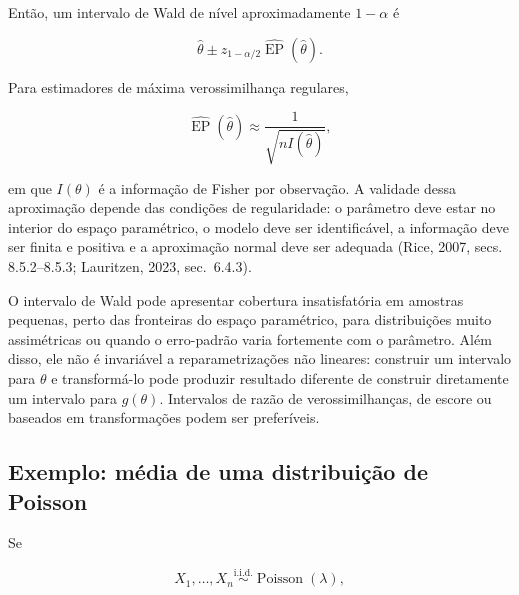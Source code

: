 \documentclass[
  letterpaper,
  DIV=11,
  numbers=noendperiod]{scrreprt}
\begin{document}
Então, um intervalo de Wald de nível aproximadamente \(1-\alpha\) é

\[\boxed{
\widehat\theta\pm z_{1-\alpha/2}
\widehat{\operatorname{EP}}(\widehat\theta)
}.\]

Para estimadores de máxima verossimilhança regulares,

\[\widehat{\operatorname{EP}}(\widehat\theta)
\approx\frac{1}{\sqrt{nI(\widehat\theta)}},\]

em que \(I(\theta)\) é a informação de Fisher por observação. A validade
dessa aproximação depende das condições de regularidade: o parâmetro
deve estar no interior do espaço paramétrico, o modelo deve ser
identificável, a informação deve ser finita e positiva e a aproximação
normal deve ser adequada (Rice, 2007, secs. 8.5.2--8.5.3; Lauritzen,
2023, sec.~6.4.3).

\begin{tcolorbox}[enhanced jigsaw, colback=white, leftrule=.75mm, colbacktitle=quarto-callout-warning-color!10!white, breakable, titlerule=0mm, bottomtitle=1mm, title=\textcolor{quarto-callout-warning-color}{\faExclamationTriangle}\hspace{0.5em}{Limitações do intervalo de Wald}, colframe=quarto-callout-warning-color-frame, toprule=.15mm, opacityback=0, bottomrule=.15mm, opacitybacktitle=0.6, arc=.35mm, toptitle=1mm, rightrule=.15mm, coltitle=black, left=2mm]

O intervalo de Wald pode apresentar cobertura insatisfatória em amostras
pequenas, perto das fronteiras do espaço paramétrico, para distribuições
muito assimétricas ou quando o erro-padrão varia fortemente com o
parâmetro. Além disso, ele não é invariável a reparametrizações não
lineares: construir um intervalo para \(\theta\) e transformá-lo pode
produzir resultado diferente de construir diretamente um intervalo para
\(g(\theta)\). Intervalos de razão de verossimilhanças, de escore ou
baseados em transformações podem ser preferíveis.

\end{tcolorbox}

\subsection{Exemplo: média de uma distribuição de
Poisson}\label{exemplo-muxe9dia-de-uma-distribuiuxe7uxe3o-de-poisson}

Se

\[X_1,\ldots,X_n\overset{\mathrm{i.i.d.}}{\sim}\operatorname{Poisson}(\lambda),\]
\end{document}
